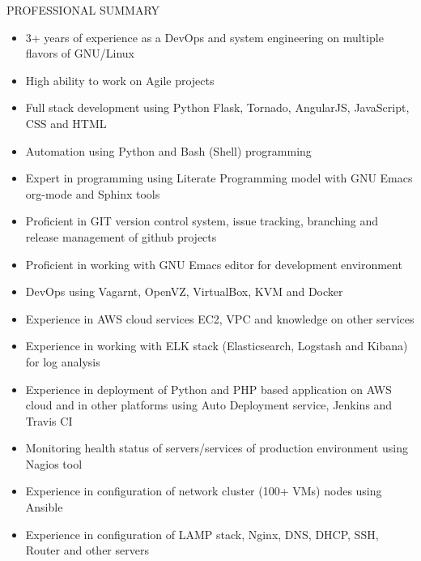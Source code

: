 \documentclass{resume} %
\begin{document}
\begin{rSection}{PROFESSIONAL SUMMARY}
  
  \begin{itemize}
    
  \item 3+ years of experience as a DevOps and system engineering on
    multiple flavors of GNU/Linux

  \item High ability to work on Agile projects

  \item Full stack development using Python Flask, Tornado, AngularJS,
    JavaScript, CSS and HTML

  \item Automation using Python and Bash (Shell) programming

  \item Expert in programming using Literate Programming model with
    GNU Emacs org-mode and Sphinx tools

  \item Proficient in GIT version control system, issue tracking,
    branching and release management of github projects

  \item Proficient in working with GNU Emacs editor for development
    environment
    
  \item DevOps using Vagarnt, OpenVZ, VirtualBox, KVM and Docker

  \item Experience in AWS cloud services EC2, VPC and knowledge on
    other services

  \item Experience in working with ELK stack (Elasticsearch, Logstash
    and Kibana) for log analysis

  \item Experience in deployment of Python and PHP based application
    on AWS cloud and in other platforms using Auto Deployment
    service, Jenkins and Travis CI

  \item Monitoring health status of servers/services of production
    environment using Nagios tool
    
  \item Experience in configuration of network cluster (100+ VMs)
    nodes using Ansible
    
  \item Experience in configuration of LAMP stack,
    Nginx, DNS, DHCP, SSH, Router and other servers


\end{itemize}
\end{rSection}
\end{document}
